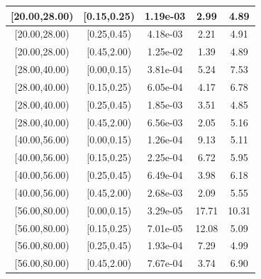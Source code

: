 \documentclass[%
aps, prd, reprint, show pacs, preprint numbers, ams math, amssymb, superscriptaddress, linenumbers]{revtex4-1}
\begin{document}
\begin{table}
\begin{tabular}{|c|c|c|c|c|}
 \hline
[20.00,28.00) & [0.15,0.25) & 1.19e-03 & 2.99 & 4.89 \\ 
 \hline
[20.00,28.00) & [0.25,0.45) & 4.18e-03 & 2.21 & 4.91 \\ 
 \hline
[20.00,28.00) & [0.45,2.00) & 1.25e-02 & 1.39 & 4.89 \\ 
 \hline
[28.00,40.00) & [0.00,0.15) & 3.81e-04 & 5.24 & 7.53 \\ 
 \hline
[28.00,40.00) & [0.15,0.25) & 6.05e-04 & 4.17 & 6.78 \\ 
 \hline
[28.00,40.00) & [0.25,0.45) & 1.85e-03 & 3.51 & 4.85 \\ 
 \hline
[28.00,40.00) & [0.45,2.00) & 6.56e-03 & 2.05 & 5.16 \\ 
 \hline
[40.00,56.00) & [0.00,0.15) & 1.26e-04 & 9.13 & 5.11 \\ 
 \hline
[40.00,56.00) & [0.15,0.25) & 2.25e-04 & 6.72 & 5.95 \\ 
 \hline
[40.00,56.00) & [0.25,0.45) & 6.49e-04 & 3.98 & 6.18 \\ 
 \hline
[40.00,56.00) & [0.45,2.00) & 2.68e-03 & 2.09 & 5.55 \\ 
 \hline
[56.00,80.00) & [0.00,0.15) & 3.29e-05 & 17.71 & 10.31 \\ 
 \hline
[56.00,80.00) & [0.15,0.25) & 7.01e-05 & 12.08 & 5.09 \\ 
 \hline
[56.00,80.00) & [0.25,0.45) & 1.93e-04 & 7.29 & 4.99 \\ 
 \hline
[56.00,80.00) & [0.45,2.00) & 7.67e-04 & 3.74 & 6.90 \\ 
 \hline
\end{tabular}
\label{table:FinalPiMinusYields}
\end{table}
\end{document}

